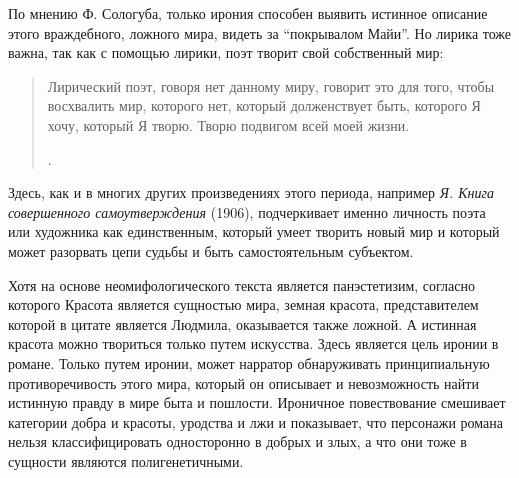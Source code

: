 \documentclass[12pt,a4paper]{article}
\begin{document}
По мнению Ф. Сологуба, только ирония способен выявить истинное описание этого враждебного, ложного мира, видеть за \enquote{покрывалом Майи}. Но лирика тоже важна, так как с помощью лирики, поэт творит свой собственный мир:

\begin{quote}
 Лирический поэт, говоря нет данному миру, говорит это для того, чтобы восхвалить мир, которого нет, который долженствует быть, которого Я хочу, который Я творю. Творю подвигом всей моей жизни. 
 
\parencite[170]{sologub1991}.
 \end{quote}
 
 Здесь, как и в многих других произведениях этого периода, например \textit{Я. Книга совершенного самоутверждения} (1906), подчеркивает именно личность поэта или художника как единственным, который умеет творить новый мир и который может разорвать цепи судьбы и быть самостоятельным субъектом.

Хотя на основе неомифологического текста является панэстетизим, согласно которого Красота является сущностью мира, земная красота, представителем которой в цитате является Людмила, оказывается также ложной. А истинная красота можно твориться только путем искусства. Здесь является цель иронии в романе. Только путем иронии, может нарратор обнаруживать принципиальную противоречивость этого мира, который он описывает и невозможность найти истинную правду в мире быта и пошлости. Ироничное повествование смешивает категории добра и красоты, уродства и лжи и показывает, что персонажи романа нельзя классифицировать односторонно в добрых и злых, а что они тоже в сущности являются полигенетичными.  





\end{document}
